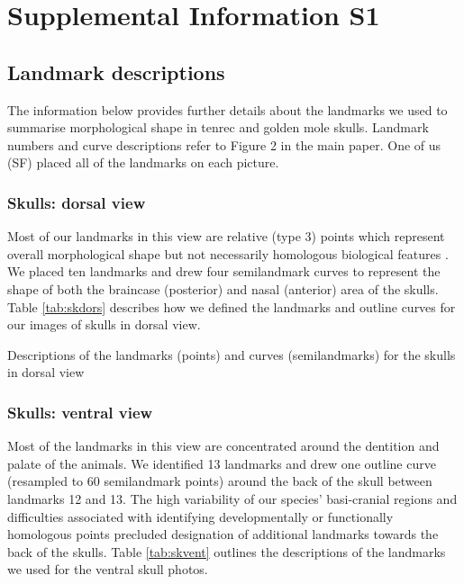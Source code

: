 \documentclass[12pt,a4paper]{article}
\newcommand{\beginsupplement}{%
	       \setcounter{table}{0}
	        \renewcommand{\thetable}{S\arabic{table}}%
	        \setcounter{figure}{0}
	        \renewcommand{\thefigure}{S\arabic{figure}}%
	     }
\begin{document}
\beginsupplement

{\centering\section{Supplemental Information S1}}

\subsection{Landmark descriptions}
\vspace*{-0.5cm}
	The information below provides further details about the landmarks we used to summarise morphological shape in tenrec and golden mole skulls. Landmark numbers and curve descriptions refer to Figure 2 in the main paper. One of us (SF) placed all of the landmarks on each picture.

\subsubsection{Skulls: dorsal view}
\vspace*{-0.5cm}
	Most of our landmarks in this view are relative (type 3) points which represent overall morphological shape but not necessarily homologous biological features \citep{Zelditch2012}. We placed ten landmarks and drew four semilandmark curves to represent the shape of both the braincase (posterior) and nasal (anterior) area of the skulls. Table \ref{tab:skdors} describes how we defined the landmarks and outline curves for our images of skulls in dorsal view.

\begin{table}[h]
	\caption[Skulls: dorsal landmarks]
		{Descriptions of the landmarks (points) and curves (semilandmarks) for the skulls in dorsal view} 
	
	\label{tab:skdors}
\end{table}

\subsubsection{Skulls: ventral view}
\vspace*{-0.5cm}
	Most of the landmarks in this view are concentrated around the dentition and palate of the animals. We identified 13 landmarks and drew one outline curve (resampled to 60 semilandmark points) around the back of the skull between landmarks 12 and 13. The high variability of our species' basi-cranial regions and difficulties associated with identifying developmentally or functionally homologous points precluded designation of additional landmarks towards the back of the skulls. Table \ref{tab:skvent} outlines the descriptions of the landmarks we used for the ventral skull photos.
\end{document}
